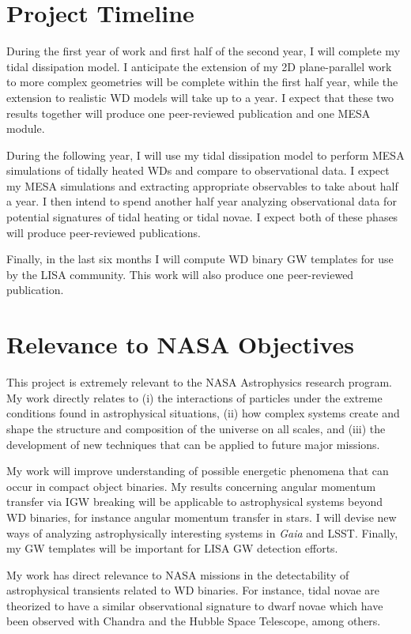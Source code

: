 \documentclass[12pt,
        usenames, %
        dvipsnames %
    ]{article}
\begin{document}
\section{Project Timeline}

During the first year of work and first half of the second year, I will complete
my tidal dissipation model. I anticipate the extension of my 2D plane-parallel
work to more complex geometries will be complete within the first half year,
while the extension to realistic WD models will take up to a year. I expect that
these two results together will produce one peer-reviewed publication and one
MESA module.

During the following year, I will use my tidal dissipation model to perform MESA
simulations of tidally heated WDs and compare to observational data. I expect my
MESA simulations and extracting appropriate observables to take about half a
year. I then intend to spend another half year analyzing observational data for
potential signatures of tidal heating or tidal novae. I expect both of these
phases will produce peer-reviewed publications.

Finally, in the last six months I will compute WD binary GW templates for use by
the LISA community. This work will also produce one peer-reviewed publication.

\section{Relevance to NASA Objectives}

This project is extremely relevant to the NASA Astrophysics research program.
My work directly relates to (i) the interactions of particles under the extreme
conditions found in astrophysical situations, (ii) how complex systems create
and shape the structure and composition of the universe on all scales, and (iii)
the development of new techniques that can be applied to future major missions.

My work will improve understanding of possible energetic phenomena that can
occur in compact object binaries. My results concerning angular momentum
transfer via IGW breaking will be applicable to astrophysical systems beyond WD
binaries, for instance angular momentum transfer in stars\cite{l_trans_rev}. I
will devise new ways of analyzing astrophysically interesting systems in
\emph{Gaia} and LSST\@. Finally, my GW templates will be important for LISA GW
detection efforts.

My work has direct relevance to NASA missions in the detectability of
astrophysical transients related to WD binaries. For instance, tidal novae are
theorized to have a similar observational signature to dwarf novae which have
been observed with Chandra and the Hubble Space Telescope, among others.

\printbibliography
\end{document}
